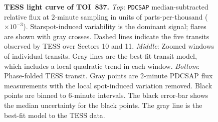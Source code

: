 \documentclass[12pt,twocolumn,tighten]{aastex63}
\newcommand{\tn}{TOI~837} %
\begin{document}
\begin{figure}[!t]
	\begin{center}
		\leavevmode
		
		\vspace{-0.5cm}
	\end{center}
	\vspace{-0.6cm}
	\caption{
    {\bf TESS light curve of \tn.}
    {\it Top}:
    \texttt{PDCSAP} median-subtracted relative flux at 2-minute
    sampling in units of parts-per-thousand ($\times 10^{-3}$).
    Starspot-induced variability is the dominant signal; flares are
    shown with gray crosses.  Dashed lines indicate the five transits
    observed by TESS over Sectors 10 and 11.  {\it Middle}: Zoomed
    windows of individual transits.  Gray lines are the best-fit
    transit model, which includes a local quadratic trend in each
    window.  {\it Bottom}: Phase-folded TESS transit. Gray points are
    2-minute PDCSAP flux measurements with the local spot-induced
    variation removed.  Black points are binned to 6-minute intervals.
    The black error-bar shows the median uncertainty for the black
    points.  The gray line is the best-fit model to the TESS
    data. 
		\label{fig:tessphot}
	}
\end{figure}
\end{document}
